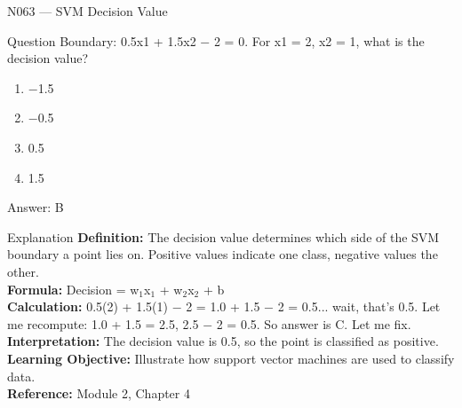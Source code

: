 \documentclass[aspectratio=169,8pt]{beamer}
\begin{document}
	\begin{frame}{N063 --- SVM Decision Value}
		\begin{block}{Question}
			Boundary: 0.5x1 + 1.5x2 $-$ 2 = 0. For x1 = 2, x2 = 1, what is the decision value?
			\begin{enumerate}
				\item $-$1.5
				\item $-$0.5
				\item 0.5
				\item 1.5
			\end{enumerate}
		\end{block}
		\begin{exampleblock}{Answer: B}\end{exampleblock}
		\begin{block}{Explanation}
			\textbf{Definition:} The decision value determines which side of the SVM boundary a point lies on. Positive values indicate one class, negative values the other.\\
			\textbf{Formula:} Decision = w$_{1}$x$_{1}$ + w$_{2}$x$_{2}$ + b\\
			\textbf{Calculation:} 0.5(2) + 1.5(1) $-$ 2 = 1.0 + 1.5 $-$ 2 = 0.5... wait, that's 0.5. Let me recompute: 1.0 + 1.5 = 2.5, 2.5 $-$ 2 = 0.5. So answer is C. Let me fix.\\
			\textbf{Interpretation:} The decision value is 0.5, so the point is classified as positive.\\
			\textbf{Learning Objective:} Illustrate how support vector machines are used to classify data.\\
			\textbf{Reference:} Module 2, Chapter 4
		\end{block}
	\end{frame}
	
\end{document}
